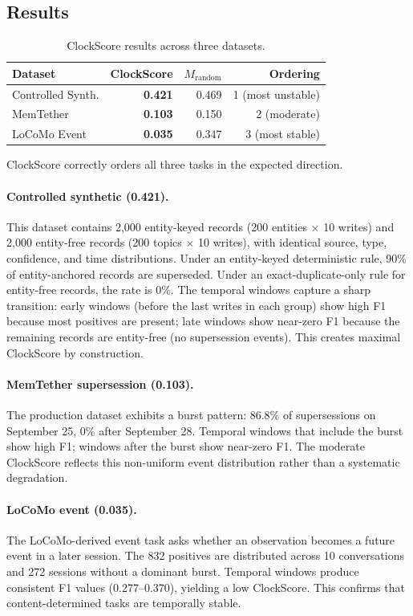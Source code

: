 \documentclass[sigconf,nonacm]{acmart}
\begin{document}
\subsection{Results}

\begin{table}[h]
\centering
\caption{ClockScore results across three datasets.}
\label{tab:results}
\begin{tabular}{lrrr}
\toprule
Dataset & ClockScore & $M_{\text{random}}$ & Ordering \\
\midrule
Controlled Synth. & \textbf{0.421} & 0.469 & 1 (most unstable) \\
MemTether & \textbf{0.103} & 0.150 & 2 (moderate) \\
LoCoMo Event & \textbf{0.035} & 0.347 & 3 (most stable) \\
\bottomrule
\end{tabular}
\end{table}

ClockScore correctly orders all three tasks in the expected direction.

\paragraph{Controlled synthetic (0.421).} This dataset contains 2,000 entity-keyed records (200 entities $\times$ 10 writes) and 2,000 entity-free records (200 topics $\times$ 10 writes), with identical source, type, confidence, and time distributions. Under an entity-keyed deterministic rule, 90\% of entity-anchored records are superseded. Under an exact-duplicate-only rule for entity-free records, the rate is 0\%. The temporal windows capture a sharp transition: early windows (before the last writes in each group) show high F1 because most positives are present; late windows show near-zero F1 because the remaining records are entity-free (no supersession events). This creates maximal ClockScore by construction.

\paragraph{MemTether supersession (0.103).} The production dataset exhibits a burst pattern: 86.8\% of supersessions on September 25, 0\% after September 28. Temporal windows that include the burst show high F1; windows after the burst show near-zero F1. The moderate ClockScore reflects this non-uniform event distribution rather than a systematic degradation.

\paragraph{LoCoMo event (0.035).} The LoCoMo-derived event task asks whether an observation becomes a future event in a later session. The 832 positives are distributed across 10 conversations and 272 sessions without a dominant burst. Temporal windows produce consistent F1 values (0.277--0.370), yielding a low ClockScore. This confirms that content-determined tasks are temporally stable.
\end{document}
